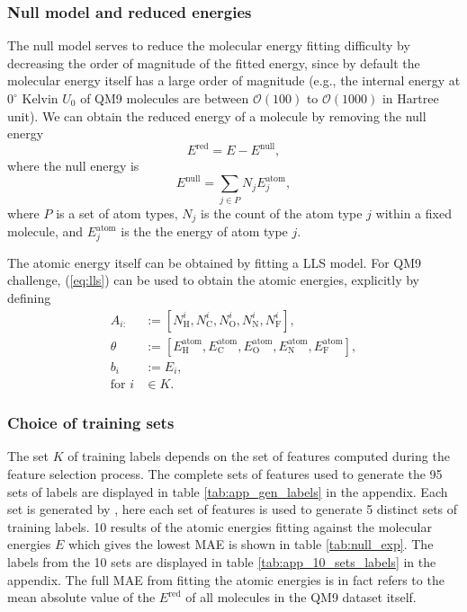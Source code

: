 \documentclass[12pt]{article}
\begin{document}
\subsubsection{Null model and reduced energies}
\label{subsubsec:ered}
The null model serves to reduce the molecular energy fitting difficulty by decreasing the order of magnitude of the fitted energy, since by default the molecular energy itself has a large order of magnitude (e.g., the internal energy at $0^{\circ}$ Kelvin $U_0$ of QM9 molecules are between $\mathcal{O}(100)$ to $\mathcal{O}(1000)$ in Hartree unit). We can obtain the reduced energy of a molecule by removing the null energy
\begin{equation}
	\label{eq:ered}
	E^\text{red} = E - E^\text{null},
\end{equation}
where the null energy is
\begin{equation}
	E^\text{null} = \sum_{j \in P} N_j E^\text{atom}_j,
\end{equation}
where $P$ is a set of atom types, $N_j$ is the count of the atom type $j$ within a fixed molecule, and $E^\text{atom}_j$ is the the energy of atom type $j$.

The atomic energy itself can be obtained by fitting a LLS model. For QM9 challenge, (\ref{eq:lls}) can be used to obtain the atomic energies, explicitly by defining
\begin{equation}
	\label{eq:enull2}
	\begin{split}
		A_{i:} &:= [N^i_\text{H}, N^i_\text{C}, N^i_\text{O}, N^i_\text{N}, N^i_\text{F}], \\
		\theta &:= [E^\text{atom}_\text{H}, E^\text{atom}_\text{C}, E^\text{atom}_\text{O}, E^\text{atom}_\text{N}, E^\text{atom}_\text{F}], \\
		b_i &:= E_i, \\
		\text{for }i &\in K.
	\end{split}
\end{equation}
\subsubsection{Choice of training sets}
The set $K$ of training labels depends on the set of features computed during the feature selection process. The complete sets of features used to generate the 95 sets of labels are displayed in table \ref{tab:app_gen_labels} in the appendix. Each set is generated by , here each set of features is used to generate 5 distinct sets of training labels. 10 results of the atomic energies fitting against the molecular energies $E$ which gives the lowest MAE is shown in table \ref{tab:null_exp}. The labels from the 10 sets are displayed in table \ref{tab:app_10_sets_labels} in the appendix.
The full MAE from fitting the atomic energies is in fact refers to the mean absolute value of the $E^\text{red}$ of all molecules in the QM9 dataset itself.
\end{document}

